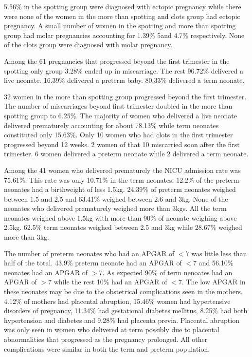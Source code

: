 \documentclass[14pt]{extarticle}
\begin{document}
5.56\% in the spotting group were diagnosed with ectopic pregnancy while there were none of the women in the more than spotting and clots group had ectopic pregnancy. A small number of women in the spotting and more than spotting group had molar pregnancies accounting for 1.39\% 5and 4.7\% respectively. None of the clots group were diagnosed with molar pregnancy.

Among the 61 pregnancies that progressed beyond the first trimester in the spotting only group 3.28\% ended up in miscarriage. The rest 96.72\% delivered a live neonate. 16.39\% delivered a preterm baby. 80.33\% delivered a term neonate.

32 women in the more than spotting group progressed beyond the first trimester. The number of miscarriages beyond first trimester doubled in the more than spotting group to 6.25\%. The majority of women who delivered a live neonate delivered prematurely accounting for about 78.13\% while term neonates constituted only 15.63\%. Only 10 women who had clots in the first trimester progressed beyond 12 weeks. 2 women of that 10 miscarried soon after the first trimester. 6 women delivered a preterm neonate while 2 delivered a term neonate.

Among the 41 women who delivered prematurely the NICU admission rate was 75.61\%. This rate was only 10.71\% in the term neonates. 12.2\% of the preterm neonates had a birthweight of less 1.5kg. 24.39\% of preterm neonates weighed between 1.5 and 2.5 and 63.41\% weighed between 2.6 and 3kg. None of the neonates who delivered prematurely weighed more than 3kgs. All the term neonates weighed above 1.5kg with more than 90\% of neonate weighing above 2.5kg. 62.5\% term neonates weighed between 2.5 and 3kg while 28.67\% weighed more than 3kg.

The number of preterm neonates who had an APGAR of $<$7 was little less than half of the total. 43.9\% preterm neonate had an APGAR of $<$7 and 56.10\% neonates had an APGAR of $>$7. As expected 90\% of term nenoates had an APGAR of $>$7 while the rest 10\% had an APGAR of $<$7. The low APGAR in these neonates may be due to the obstetrical complications seen in the mothers. 4.12\% of mothers had placental abruption, 15.46\% women had hypertensive disorders of pregnancy, 11.34\% had gestational diabetes mellitus, 8.25\% had both hypertension and diabetes and 9.28\% had placenta previa. Placental abruption was only seen in women who delivered at term possibly due to placental abnormalities that progressed as the pregnancy prolonged. All other complications were similar in both the term and preterm population.
\end{document}
